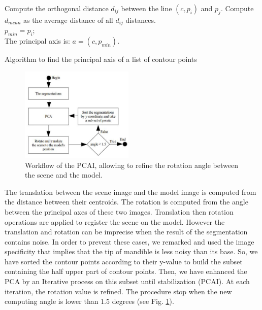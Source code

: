 \documentclass[twoside,twocolumn,10pt]{article}
\begin{document}
\begin{algorithm}
	{
		{
			{
				Compute the orthogonal distance $d_{ij}$ between the line $(c,p_i)$ and $p_j$.
			}
		}
		Compute $d_{mean}$ as the average distance of all $d_{ij}$ distances.\\

		{
			$p_{min} = p_i$;\\
		}
	}
	The principal axis is: $a = (c,p_{min})$.
	\caption{Algorithm to find the principal axis of a list of contour points}
	\label{alg1}
\end{algorithm}

\begin{figure}[htbp]
    \centering
    \includegraphics[width=0.48\textwidth]{./images/pcadiagram}
    \caption{Workflow of the PCAI, allowing to refine the rotation angle between the scene and the model.}
    \label{fig:pcai}
\end{figure}

The translation between the scene image and the model image is computed from the distance between their centroids.
The rotation is computed from the angle between the principal axes of these two images.
Translation then rotation operations are applied to register the scene on the model.
However the translation and rotation can be imprecise when the result of the segmentation contains noise.
In order to prevent these cases, we remarked and used the image specificity that implies that the tip of mandible is less noisy than its base.
So, we have sorted the contour points according to their y-value to build the subset containing the half upper part of contour points.
Then, we have enhanced the PCA by an Iterative process on this subset until stabilization (PCAI).
At each iteration, the rotation value is refined.
The procedure stop when the new computing angle is lower than $1.5$ degrees (see Fig. \ref{fig:pcai}).
\end{document}
